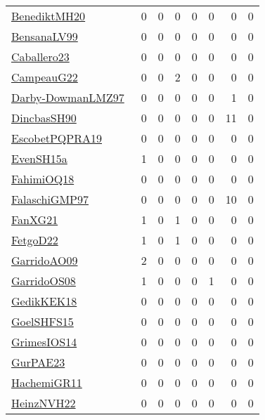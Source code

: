 {\begin{longtable}{l*{7}{r}}
\href{articles/BenediktMH20.pdf}{BenediktMH20}~\cite{BenediktMH20} & 0 & 0 & 0 & 0 & 0 & 0 & 0\\
\href{articles/BensanaLV99.pdf}{BensanaLV99}~\cite{BensanaLV99} & 0 & 0 & 0 & 0 & 0 & 0 & 0\\
\href{articles/Caballero23.pdf}{Caballero23}~\cite{Caballero23} & 0 & 0 & 0 & 0 & 0 & 0 & 0\\
\href{articles/CampeauG22.pdf}{CampeauG22}~\cite{CampeauG22} & 0 & 0 & 2 & 0 & 0 & 0 & 0\\
\href{articles/Darby-DowmanLMZ97.pdf}{Darby-DowmanLMZ97}~\cite{Darby-DowmanLMZ97} & 0 & 0 & 0 & 0 & 0 & 1 & 0\\
\href{articles/DincbasSH90.pdf}{DincbasSH90}~\cite{DincbasSH90} & 0 & 0 & 0 & 0 & 0 & 11 & 0\\
\href{articles/EscobetPQPRA19.pdf}{EscobetPQPRA19}~\cite{EscobetPQPRA19} & 0 & 0 & 0 & 0 & 0 & 0 & 0\\
\href{articles/EvenSH15a.pdf}{EvenSH15a}~\cite{EvenSH15a} & 1 & 0 & 0 & 0 & 0 & 0 & 0\\
\href{articles/FahimiOQ18.pdf}{FahimiOQ18}~\cite{FahimiOQ18} & 0 & 0 & 0 & 0 & 0 & 0 & 0\\
\href{articles/FalaschiGMP97.pdf}{FalaschiGMP97}~\cite{FalaschiGMP97} & 0 & 0 & 0 & 0 & 0 & 10 & 0\\
\href{articles/FanXG21.pdf}{FanXG21}~\cite{FanXG21} & 1 & 0 & 1 & 0 & 0 & 0 & 0\\
\href{articles/FetgoD22.pdf}{FetgoD22}~\cite{FetgoD22} & 1 & 0 & 1 & 0 & 0 & 0 & 0\\
\href{articles/GarridoAO09.pdf}{GarridoAO09}~\cite{GarridoAO09} & 2 & 0 & 0 & 0 & 0 & 0 & 0\\
\href{articles/GarridoOS08.pdf}{GarridoOS08}~\cite{GarridoOS08} & 1 & 0 & 0 & 0 & 1 & 0 & 0\\
\href{articles/GedikKEK18.pdf}{GedikKEK18}~\cite{GedikKEK18} & 0 & 0 & 0 & 0 & 0 & 0 & 0\\
\href{articles/GoelSHFS15.pdf}{GoelSHFS15}~\cite{GoelSHFS15} & 0 & 0 & 0 & 0 & 0 & 0 & 0\\
\href{articles/GrimesIOS14.pdf}{GrimesIOS14}~\cite{GrimesIOS14} & 0 & 0 & 0 & 0 & 0 & 0 & 0\\
\href{articles/GurPAE23.pdf}{GurPAE23}~\cite{GurPAE23} & 0 & 0 & 0 & 0 & 0 & 0 & 0\\
\href{articles/HachemiGR11.pdf}{HachemiGR11}~\cite{HachemiGR11} & 0 & 0 & 0 & 0 & 0 & 0 & 0\\
\href{articles/HeinzNVH22.pdf}{HeinzNVH22}~\cite{HeinzNVH22} & 0 & 0 & 0 & 0 & 0 & 0 & 0\\

\end{longtable}}
